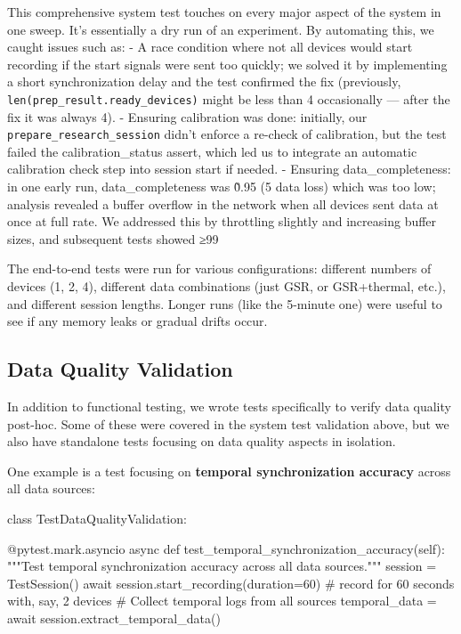 \documentclass[11pt,a4paper]{report}
\begin{document}
This comprehensive system test touches on every major aspect of the
system in one sweep. It's essentially a dry run of an experiment. By
automating this, we caught issues such as: - A race condition where not
all devices would start recording if the start signals were sent too
quickly; we solved it by implementing a short synchronization delay and
the test confirmed the fix (previously, \texttt{len(prep\_result.ready\_devices)}
might be less than 4 occasionally --- after the fix it was always 4). -
Ensuring calibration was done: initially, our \texttt{prepare\_research\_session}
didn't enforce a re-check of calibration, but the test failed the
calibration\_status assert, which led us to integrate an automatic
calibration check step into session start if needed. - Ensuring
data\_completeness: in one early run, data\_completeness was \~0.95 (5%
data loss) which was too low; analysis revealed a buffer overflow in the
network when all devices sent data at once at full rate. We addressed
this by throttling slightly and increasing buffer sizes, and subsequent
tests showed ≥99%

The end-to-end tests were run for various configurations: different
numbers of devices (1, 2, 4), different data combinations (just GSR, or
GSR+thermal, etc.), and different session lengths. Longer runs (like the
5-minute one) were useful to see if any memory leaks or gradual drifts
occur.

\subsection{Data Quality Validation}

In addition to functional testing, we wrote tests specifically to verify
data quality post-hoc. Some of these were covered in the system test
validation above, but we also have standalone tests focusing on data
quality aspects in isolation.

One example is a test focusing on \textbf{temporal synchronization accuracy}
across all data sources:

    class TestDataQualityValidation:

        @pytest.mark.asyncio
        async def test\_temporal\_synchronization\_accuracy(self):
            """Test temporal synchronization accuracy across all data sources."""
            session = TestSession()
            await session.start\_recording(duration=60)  # record for 60 seconds with, say, 2 devices
            # Collect temporal logs from all sources
            temporal\_data = await session.extract\_temporal\_data()
\end{document}
